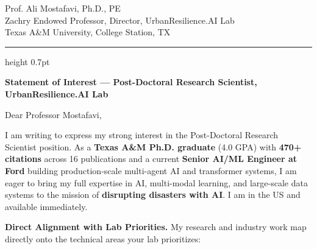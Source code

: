 \documentclass[11pt,letterpaper]{article}
\begin{document}
\noindent
\begin{minipage}[t]{0.55\textwidth}
\vspace{0pt}
{\small\color{darktext}
Prof. Ali Mostafavi, Ph.D., PE\\
Zachry Endowed Professor, Director, UrbanResilience.AI Lab\\
Texas A\&M University, College Station, TX
}
\end{minipage}%
\hfill
\begin{minipage}[t]{0.4\textwidth}
\vspace{0pt}
\end{minipage}

\vspace{0.6em}
{\color{headerblue}\hrule height 0.7pt}
\vspace{0.3em}

\begin{center}
{\bfseries\color{headerblue}Statement of Interest --- Post-Doctoral Research Scientist, UrbanResilience.AI Lab}
\end{center}

\vspace{-0.2em}

\noindent Dear Professor Mostafavi,

I am writing to express my strong interest in the Post-Doctoral Research Scientist position. As a \textbf{Texas A\&M Ph.D. graduate} (4.0 GPA) with \textbf{470+ citations} across 16 publications and a current \textbf{Senior AI/ML Engineer at Ford} building production-scale multi-agent AI and transformer systems, I am eager to bring my full expertise in AI, multi-modal learning, and large-scale data systems to the mission of \textbf{disrupting disasters with AI}. I am in the US and available immediately.

\noindent\textbf{\color{headerblue}Direct Alignment with Lab Priorities.}\enspace
My research and industry work map directly onto the technical areas your lab prioritizes:
\end{document}
